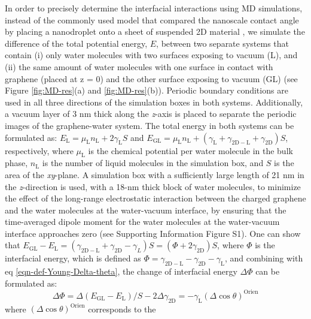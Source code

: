 \documentclass[journal=jacsat,manuscript=article,email=true,hyperref=true,keywords=true]{achemso}
\begin{document}
In order to precisely determine the interfacial interactions using MD
simulations, instead of the commonly used model that compared the
nanoscale contact angle by placing a nanodroplet onto a sheet of
suspended 2D material
\cite{ostrowski_tunable_2014,daub_electrowetting_2007,ren_interfacial_2015,Taherian_2015},
we simulate the difference of the total potential energy, \(E\), between
two separate systems that contain (i) only water molecules with two
surfaces exposing to vacuum (L), and (ii) the same amount of water
molecules with one surface in contact with graphene (placed at z = 0)
and the other surface exposing to vacuum (GL) (see Figure
\ref{fig:MD-res}(a) and \ref{fig:MD-res}(b)). Periodic boundary
conditions are used in all three directions of the simulation boxes in
both systems. Additionally, a vacuum layer of 3 nm thick along the
\emph{z}-axis is placed to separate the periodic images of the
graphene-water system. The total energy in both systems can be
formulated as: \(E_{\mathrm{L}} = \mu_{\mathrm{L}}n_{\mathrm{L}} +
2\gamma_{\mathrm{L}}S\) and
\(E_{\mathrm{GL}}=\mu_{\mathrm{L}}n_{\mathrm{L}}+(\gamma_{\mathrm{L}} +
\gamma_{\mathrm{2D-L}} + \gamma_{\mathrm{2D}})S\), respectively, where
\(\mu_{\mathrm{L}}\) is the chemical potential per water molecule in the
bulk phase, \(n_{\mathrm{L}}\) is the number of liquid molecules in the
simulation box, and \(S\) is the area of the \emph{xy}-plane.  A simulation
box with a sufficiently large length of 21 nm in the \emph{z}-direction is used,
with a 18-nm thick block of water molecules, to minimize the effect of
the long-range electrostatic interaction between the charged graphene
and the water molecules at the water-vacuum interface, by ensuring
that the time-averaged dipole moment for the water molecules at the
water-vacuum interface approaches zero (see Supporting Information
Figure S1).  One can show that \(E_{\mathrm{GL}} - E_{\mathrm{L}} =
(\gamma_{\mathrm{2D-L}} + \gamma_{\mathrm{2D}} - \gamma_{L})S =
(\Phi + 2 \gamma_{\mathrm{2D}})S\), where \(\Phi\) is the interfacial
energy, which is defined as \(\Phi = \gamma_{\mathrm{2D-L}} -
\gamma_{\mathrm{2D}} - \gamma_{\mathrm{L}}\), and combining with eq
\ref{eqn-def-Young-Delta-theta}, the change of interfacial energy
\(\Delta \Phi\) can be formulated as:
\begin{equation}
\label{eqn-Delta-Phi-Delta-cos}
\Delta \Phi = \Delta (E_{\mathrm{GL}} - E_{\mathrm{L}})/S - 2\Delta \gamma_{\mathrm{2D}} = -\gamma_{\mathrm{L}} (\Delta \cos \theta)^{\mathrm{Orien}}
\end{equation}
where \((\Delta\cos \theta)^{\mathrm{Orien}}\) corresponds to the
\end{document}
